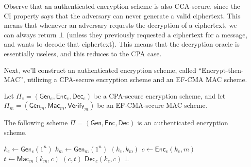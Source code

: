 Observe that an authenticated encryption scheme is also CCA-secure, since the CI property says that the adversary can never generate a valid ciphertext. This means that whenever an adversary requests the decryption of a ciphertext, we can always return $\bot$ (unless they previously requested a ciphertext for a message, and wants to decode that ciphertext). This means that the decryption oracle is essentially useless, and this reduces to the CPA case.

Next, we'll construct an authenticated encryption scheme, called ``Encrypt-then-MAC'', utilizing a CPA-secure encryption scheme and an EF-CMA MAC scheme.

\begin{claim}
    Let $\Pi_e = (\mathsf{Gen}_e, \mathsf{Enc}_e, \mathsf{Dec}_e)$ be a CPA-secure encryption scheme, and let $\Pi_m = (\mathsf{Gen}_m, \mathsf{Mac}_m, \mathsf{Verify}_m)$ be an EF-CMA-secure MAC scheme.

    The following scheme $\Pi = (\mathsf{Gen}, \mathsf{Enc}, \mathsf{Dec})$ is an authenticated encryption scheme.

    \begin{algorithmic}[1]
            \State $k_e \gets \mathsf{Gen}_e(1^n)$
            \State $k_m \gets \mathsf{Gen}_m(1^n)$
            \State \Return $(k_e, k_m)$
        \EndFunction
        \Statex
            \State $c \gets \mathsf{Enc}_e(k_e, m)$
            \State $t \gets \mathsf{Mac}_m(k_m, c)$
            \State \Return $(c, t)$
        \EndFunction
        \Statex
                \State \Return $\mathsf{Dec}_e(k_e, c)$
            \Else
                \State \Return $\bot$
            \EndIf 
        \EndFunction
    \end{algorithmic}
\end{claim}

